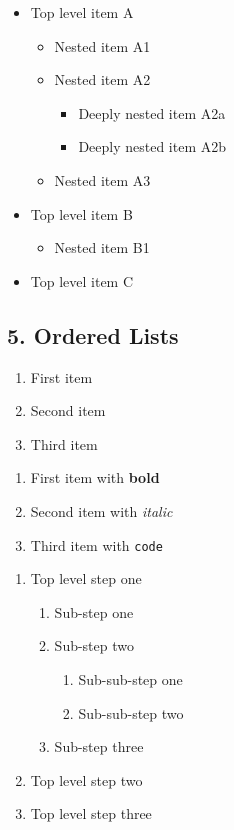 \documentclass{article}
\begin{document}
\begin{itemize}
\item  Top level item A
\begin{itemize}
\item  Nested item A1
\item  Nested item A2
\begin{itemize}
\item  Deeply nested item A2a
\item  Deeply nested item A2b
\end{itemize}


\item  Nested item A3
\end{itemize}


\item  Top level item B
\begin{itemize}
\item  Nested item B1
\end{itemize}


\item  Top level item C
\end{itemize}

\subsection{ 5. Ordered Lists}

\begin{enumerate}
\item  First item
\item  Second item
\item  Third item
\end{enumerate}

\begin{enumerate}
\item  First item with \textbf{bold}
\item  Second item with \emph{italic}
\item  Third item with \texttt{code}
\end{enumerate}

\begin{enumerate}
\item  Top level step one
\begin{enumerate}
\item  Sub-step one
\item  Sub-step two
\begin{enumerate}
\item  Sub-sub-step one
\item  Sub-sub-step two
\end{enumerate}


\item  Sub-step three
\end{enumerate}


\item  Top level step two
\item  Top level step three
\end{enumerate}
\end{document}
